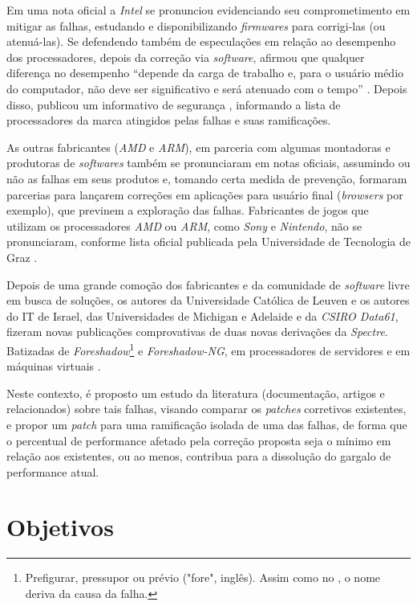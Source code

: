\documentclass[
	12pt,				%
	openright,			%
	oneside,            %
	a4paper,			%
	chapter=TITLE,		%
	section=TITLE,		%
	subsection=TITLE,	%
	subsubsection=TITLE,%
	english,			%
	brazil,				%
]{abntex2}
\begin{document}
Em uma nota oficial a \emph{Intel} se pronunciou evidenciando seu comprometimento em mitigar as falhas, estudando e disponibilizando \emph{firmwares} para corrigi-las (ou atenuá-las). Se defendendo também de especulações em relação ao desempenho dos processadores, depois da correção via \emph{software}, afirmou que qualquer diferença no desempenho “depende da carga de trabalho e, para o usuário médio do computador, não deve ser significativo e será atenuado com o tempo” \cite{intel-news-001}. Depois disso, publicou um informativo de segurança \cite{intel-sa-00088}, informando a lista de processadores da marca atingidos pelas falhas e suas ramificações.

As outras fabricantes (\emph{AMD} e \emph{ARM}), em parceria com algumas montadoras e produtoras de \emph{softwares} também se pronunciaram em notas oficiais, assumindo ou não as falhas em seus produtos e, tomando certa medida de prevenção, formaram parcerias para lançarem correções em aplicações para usuário final (\emph{browsers} por exemplo), que previnem a exploração das falhas. Fabricantes de jogos que utilizam os processadores \emph{AMD} ou \emph{ARM}, como \emph{Sony} e \emph{Nintendo}, não se pronunciaram, conforme lista oficial publicada pela Universidade de Tecnologia de Graz \cite{meltdownspectreattack}.

Depois de uma grande comoção dos fabricantes e da comunidade de \emph{software} livre em busca de soluções, os autores da Universidade Católica de Leuven e os autores do IT de Israel, das Universidades de Michigan e Adelaide e da \emph{CSIRO Data61}, fizeram novas publicações comprovativas de duas novas derivações da \emph{Spectre}. Batizadas de \emph{Foreshadow}\footnote{Prefigurar, pressupor ou prévio ("fore", inglês). Assim como no , o nome deriva da causa da falha.} e \emph{Foreshadow-NG}, em processadores de servidores e em máquinas virtuais \cite{foreshadowattack}.

Neste contexto, é proposto um estudo da literatura (documentação, artigos e relacionados) sobre tais falhas, visando comparar os \emph{patches} corretivos existentes, e propor um \emph{patch} para uma ramificação isolada de uma das falhas, de forma que o percentual de performance afetado pela correção proposta seja o mínimo em relação aos existentes, ou ao menos, contribua para a dissolução do gargalo de performance atual.

\chapter{Objetivos}
\end{document}
